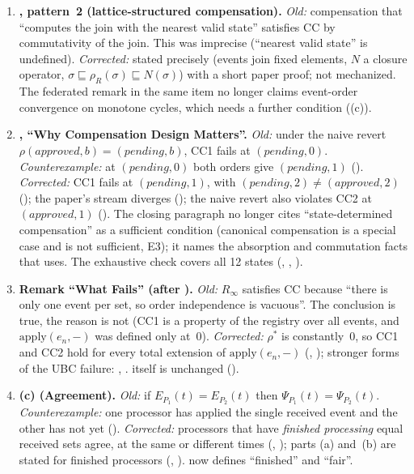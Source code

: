 \documentclass[11pt,a4paper]{article}
\theoremstyle{plain}
\theoremstyle{definition}
\theoremstyle{remark}
\renewcommand{\_}{\textunderscore\allowbreak}
\begin{document}
\begin{enumerate}[leftmargin=*,label=\textbf{E\arabic*.},ref=E\arabic*]
\item \textbf{, pattern~2 (lattice-structured
  compensation).}
  \emph{Old:} compensation that ``computes the join with the nearest valid
  state'' satisfies CC by commutativity of the join.  This was imprecise
  (``nearest valid state'' is undefined).
  \emph{Corrected:} stated precisely (events join fixed elements, $N$ a
  closure operator, $\sigma \sqsubseteq \rho_R(\sigma) \sqsubseteq N(\sigma)$)
  with a short paper proof; not mechanized.  The federated remark in the same
  item no longer claims event-order convergence on monotone cycles, which
  needs a further condition ((c)).

\item \textbf{, ``Why Compensation Design Matters''.}
  \emph{Old:} under the naive revert $\rho(\textit{approved}, b) =
  (\textit{pending}, b)$, CC1 fails at $(\textit{pending}, 0)$.
  \emph{Counterexample:} at $(\textit{pending}, 0)$ both orders give
  $(\textit{pending}, 1)$ ().
  \emph{Corrected:} CC1 fails at $(\textit{pending}, 1)$, with
  $(\textit{pending}, 2) \neq (\textit{approved}, 2)$
  (); the paper's stream diverges
  (); the naive revert also violates CC2 at
  $(\textit{approved}, 1)$ ().  The closing paragraph
  no longer cites ``state-determined compensation'' as a sufficient
  condition (canonical compensation is a special case and is not sufficient,
  E3); it names the absorption and commutation facts that
   uses.  The exhaustive check covers all 12 states
  (, , ).

\item \textbf{Remark ``What Fails'' (after ).}
  \emph{Old:} $R_\infty$ satisfies CC because ``there is only one event per
  set, so order independence is vacuous''.  The conclusion is true, the
  reason is not (CC1 is a property of the registry over all events, and
  $\mathrm{apply}(e_n, -)$ was defined only at~0).
  \emph{Corrected:} $\rho^*$ is constantly~0, so CC1 and CC2 hold for every
  total extension of $\mathrm{apply}(e_n, -)$ (,
  ); stronger forms of the UBC failure:
  , .   itself is
  unchanged ().

\item \textbf{(c) (Agreement).}
  \emph{Old:} if $E_{P_1}(t) = E_{P_2}(t)$ then $\Psi_{P_1}(t) =
  \Psi_{P_2}(t)$.
  \emph{Counterexample:} one processor has applied the single received event
  and the other has not yet ().
  \emph{Corrected:} processors that have \emph{finished processing} equal
  received sets agree, at the same or different times
  (, ); parts (a) and~(b)
  are stated for finished processors (,
  ).   now defines
  ``finished'' and ``fair''.


\end{enumerate}
\end{document}
